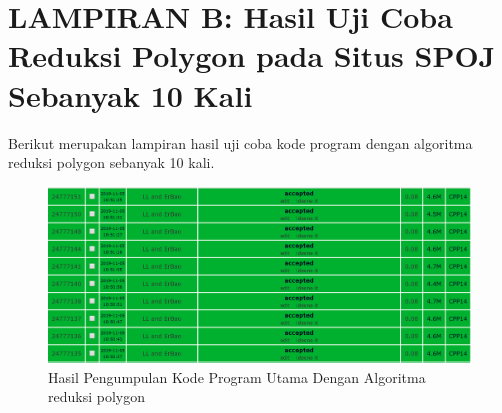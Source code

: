 \chapter{LAMPIRAN B: Hasil Uji Coba Reduksi Polygon pada Situs SPOJ Sebanyak 10 Kali}

Berikut merupakan lampiran hasil uji coba kode program dengan algoritma reduksi polygon sebanyak 10 kali.

\renewcommand{\thefigure}{C.\arabic{figure}}
\setcounter{figure}{0}

\begin{figure}[!h]
 \Centering
 \includegraphics[width=\columnwidth]{bab5/img/hasil-pengumpulan-kode-program}
 \caption{Hasil Pengumpulan Kode Program Utama Dengan Algoritma reduksi polygon}
 \label{fig:hasil-pengumpulan-kode-program}
\end{figure}